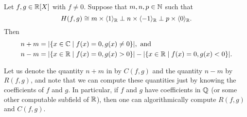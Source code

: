 \documentclass[12pt, leqno, british]{amsart}
\begin{document}
\begin{thm}\label{T:Hermite}
Let $f, g \in \mathbb R[X]$ with $f \neq 0$.
Suppose that $m, n, p \in \mathbb N$ such that
$$ H(f, g) \cong m \times \langle 1 \rangle_\mathbb R \perp n \times \langle -1 \rangle_\mathbb R \perp p \times \langle 0 \rangle_\mathbb R.$$
Then
\begin{align*}
n + m &= \lvert \lbrace x \in \mathbb C \mid f(x) = 0, g(x) \neq 0 \rbrace \rvert, \text{ and} \\
n - m &=  \lvert \lbrace x \in \mathbb R \mid f(x) = 0, g(x) > 0 \rbrace \rvert - \lvert \lbrace x \in \mathbb R \mid f(x) = 0, g(x) < 0 \rbrace \rvert.
\end{align*}
\end{thm}
Let us denote the quantity $n+m$ in  by $C(f, g)$ and the quantity $n-m$ by $R(f, g)$, and note that we can compute these quantities just by knowing the coefficients of $f$ and $g$.
In particular, if $f$ and $g$ have coefficients in $\mathbb Q$ (or some other computable subfield of $\mathbb R$), then one can algorithmically compute $R(f, g)$ and $C(f, g)$.
\end{document}
